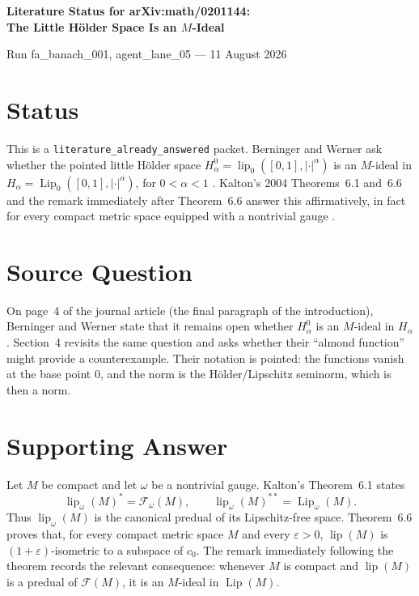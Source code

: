 \documentclass[10pt]{article}
\begin{document}
\begin{center}
{\Large\bfseries Literature Status for arXiv:math/0201144:\\
The Little H\"older Space Is an $M$-Ideal\par}
\smallskip
{\small Run fa\_banach\_001, agent\_lane\_05 --- 11 August 2026}
\end{center}
\vspace{-0.7em}

\section*{Status}

This is a \texttt{literature\_already\_answered} packet.  Berninger and
Werner ask whether the pointed little H\"older space
\(H_\alpha^0=\operatorname{lip}_0([0,1],|\cdot|^\alpha)\) is an
\(M\)-ideal in
\(H_\alpha=\operatorname{Lip}_0([0,1],|\cdot|^\alpha)\), for
\(0<\alpha<1\) \cite{BW03}.  Kalton's 2004 Theorems~6.1 and~6.6 and the
remark immediately after Theorem~6.6 answer this affirmatively, in fact for
every compact metric space equipped with a nontrivial gauge \cite{Kalton04}.

\section*{Source Question}

On page~4 of the journal article (the final paragraph of the introduction),
Berninger and Werner state that it remains open whether \(H_\alpha^0\) is an
\(M\)-ideal in \(H_\alpha\).  Section~4 revisits the same question and asks
whether their ``almond function'' might provide a counterexample.  Their
notation is pointed: the functions vanish at the base point \(0\), and the
norm is the H\"older/Lipschitz seminorm, which is then a norm.

\section*{Supporting Answer}

Let \(M\) be compact and let \(\omega\) be a nontrivial gauge.  Kalton's
Theorem~6.1 states
\[
 \operatorname{lip}_\omega(M)^*=\mathcal F_\omega(M),
 \qquad
 \operatorname{lip}_\omega(M)^{**}=\operatorname{Lip}_\omega(M).
\]
Thus \(\operatorname{lip}_\omega(M)\) is the canonical predual of its
Lipschitz-free space.  Theorem~6.6 proves that, for every compact metric
space \(M\) and every \(\varepsilon>0\), \(\operatorname{lip}(M)\) is
\((1+\varepsilon)\)-isometric to a subspace of \(c_0\).  The remark
immediately following the theorem records the relevant consequence:
whenever \(M\) is compact and \(\operatorname{lip}(M)\) is a predual of
\(\mathcal F(M)\), it is an \(M\)-ideal in \(\operatorname{Lip}(M)\).
\end{document}
